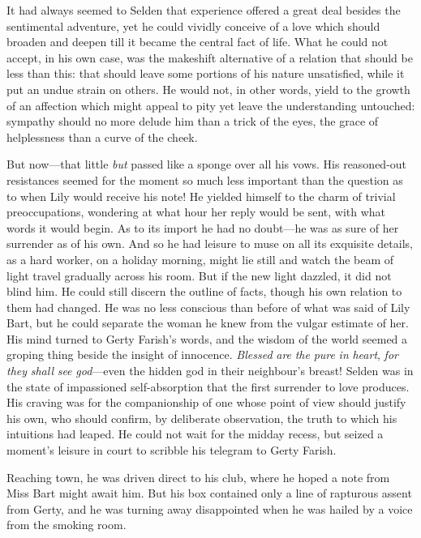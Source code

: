 \documentclass[12pt,a4paper]{book}
\begin{document}
It had always seemed to Selden that experience offered a great
deal besides the sentimental adventure, yet he could vividly
conceive of a love which should broaden and deepen till it became
the central fact of life. What he could not accept, in his own
case, was the makeshift alternative of a relation that should be
less than this: that should leave some portions of his nature
unsatisfied, while it put an undue strain on others. He would
not, in other words, yield to the growth of an affection which
might appeal to pity yet leave the understanding untouched: 
sympathy should no more delude him than a trick of the eyes, the
grace of helplessness than a curve of the cheek.





But now---that little \textit{but} passed like a sponge over all his vows. 
His reasoned-out resistances seemed for the moment so much less
important than the question as to when Lily would receive his
note! He yielded himself to the charm of trivial
preoccupations, wondering at what hour her reply would be sent,
with what words it would begin. As to its import he had no
doubt---he was as sure of her surrender as of his own. And so he
had leisure to muse on all its exquisite details, as a hard
worker, on a holiday morning, might lie still and watch the beam
of light travel gradually across his room. But if the new light
dazzled, it did not blind him. He could still discern the outline
of facts, though his own relation to them had changed. He was no
less conscious than before of what was said of Lily Bart, but he
could separate the woman he knew from the vulgar estimate of her. 
His mind turned to Gerty Farish's words, and the wisdom of the
world seemed a groping thing beside the insight of innocence. 
\textit{Blessed} \textit{are} \textit{the} \textit{pure} \textit{in} \textit{heart}, \textit{for} \textit{they} \textit{shall} \textit{see} \textit{god}---even the
hidden god in their neighbour's breast! Selden was in the state
of impassioned self-absorption that the first surrender to love
produces. His craving was for the companionship of one whose
point of view should justify his own, who should confirm, by
deliberate observation, the truth to which his intuitions had
leaped. He could not wait for the midday recess, but seized a
moment's leisure in court to scribble his telegram to Gerty
Farish.





Reaching town, he was driven direct to his club, where he hoped a
note from Miss Bart might await him. But his box contained only a
line of rapturous assent from Gerty, and he was turning away
disappointed when he was hailed by a voice from the smoking room.
\end{document}
